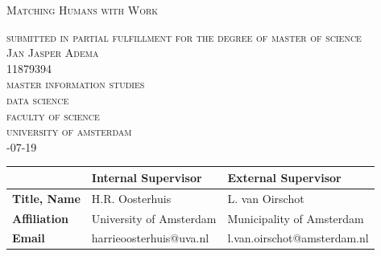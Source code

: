 \begin{titlepage}


\begin{center}
 
\textsc{\Large   Matching Humans with Work}

\bigskip

\textsc{\large
submitted in partial fulfillment for the degree of master of science\\
%
\bigskip
Jan Jasper Adema\\
%
11879394\\
%
\bigskip
master information studies\\
%
data science \\
%
faculty of science\\
%
university of amsterdam\\
%
-07-19
}

\end{center}
 

\vfill

\begin{center}
\begin{tabular}{|l||ll|}
\hline
 & \textbf{Internal  Supervisor} & \textbf{External   Supervisor}  \\   
 \hline
\textbf{Title, Name} & H.R. Oosterhuis &  L. van Oirschot\\
\textbf{Affiliation} &University of Amsterdam & Municipality of Amsterdam\\ 
\textbf{Email} & harrieoosterhuis@uva.nl& l.van.oirschot@amsterdam.nl\\
\hline
\end{tabular}
\end{center}





\end{titlepage}
